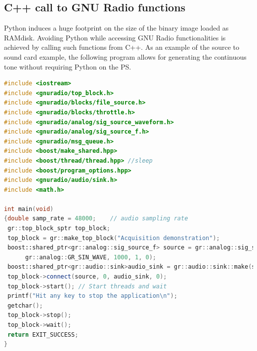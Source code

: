 \documentclass[12pt,oneside]{article}
\begin{document}
\subsection{C++ call to GNU Radio functions}

Python induces a huge footprint on the size of the binary image loaded as RAMdisk. Avoiding 
Python while accessing GNU Radio functionalities is achieved by calling such functions from
C++. As an example of the source to sound card example, the following program allows for generating
the continuous tone without requiring Python on the PS.

\begin{lstlisting}[language=C++]
#include <iostream>
#include <gnuradio/top_block.h>
#include <gnuradio/blocks/file_source.h>
#include <gnuradio/blocks/throttle.h>
#include <gnuradio/analog/sig_source_waveform.h>
#include <gnuradio/analog/sig_source_f.h>
#include <gnuradio/msg_queue.h>
#include <boost/make_shared.hpp>
#include <boost/thread/thread.hpp> //sleep
#include <boost/program_options.hpp>
#include <gnuradio/audio/sink.h>
#include <math.h>

int main(void)
{double samp_rate = 48000;    // audio sampling rate
 gr::top_block_sptr top_block;
 top_block = gr::make_top_block("Acquisition demonstration");
 boost::shared_ptr<gr::analog::sig_source_f> source = gr::analog::sig_source_f::make(samp_rate,
      gr::analog::GR_SIN_WAVE, 1000, 1, 0);
 boost::shared_ptr<gr::audio::sink>audio_sink = gr::audio::sink::make(samp_rate, "", true);
 top_block->connect(source, 0, audio_sink, 0);
 top_block->start(); // Start threads and wait
 printf("Hit any key to stop the application\n");
 getchar();
 top_block->stop();
 top_block->wait();
 return EXIT_SUCCESS;
}
\end{lstlisting}
\end{document}
